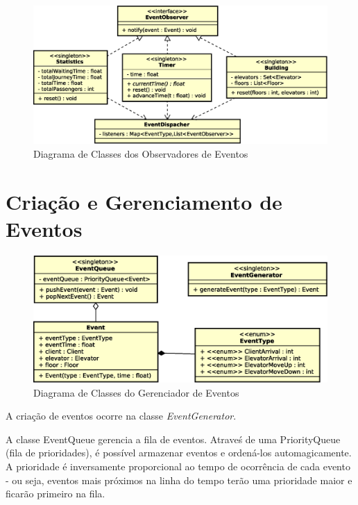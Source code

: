\begin{figure}[htb!]
  \centering
  \includegraphics[scale=0.6]{img/observers.eps}
  \caption{Diagrama de Classes dos Observadores de Eventos}
\label{fig:diagram:observers}
\end{figure}

\section{Criação e Gerenciamento de Eventos}

\begin{figure}[htb!]
  \centering
  \includegraphics[scale=0.6]{img/event_management.eps}
  \caption{Diagrama de Classes do Gerenciador de Eventos}
\label{fig:diagram:event:manage}
\end{figure}

A criação de eventos ocorre na classe \textit{EventGenerator}.

A classe EventQueue gerencia a fila de eventos. Atraveś de uma PriorityQueue
(fila de prioridades), é possível armazenar eventos e ordená-los
automagicamente. A prioridade é inversamente proporcional ao tempo de ocorrência
de cada evento - ou seja, eventos mais próximos na linha do tempo terão uma
prioridade maior e ficarão primeiro na fila.

